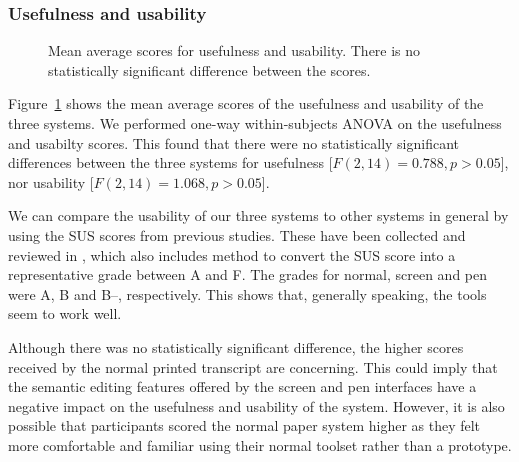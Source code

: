 \subsubsection{Usefulness and usability}

\begin{figure}[p]
  \centering
  \label{fig:usefulusable}
  \caption{Mean average scores for usefulness and usability. There is no statistically significant difference between
  the scores.}
\end{figure}

Figure~\ref{fig:usefulusable} shows the mean average scores of the usefulness and usability of the three systems.  We
performed one-way within-subjects ANOVA on the usefulness and usabilty scores. This found that there were no
statistically significant differences between the three systems for usefulness [$F(2,14)=0.788, p>0.05$], nor usability
[$F(2,14)=1.068, p>0.05$].

We can compare the usability of our three systems to other systems in general by using the SUS scores from 
previous studies. These have been collected and reviewed in \citet{Sauro2016}, which also includes method to convert
the SUS score into a representative grade between A and F.  The grades for normal, screen and pen were A, B and B--,
respectively. This shows that, generally speaking, the tools seem to work well.

Although there was no statistically significant difference, the higher scores received by the normal printed transcript
are concerning. This could imply that the semantic editing features offered by the screen and pen interfaces have a
negative impact on the usefulness and usability of the system. However, it is also possible that participants scored
the normal paper system higher as they felt more comfortable and familiar using their normal toolset rather than a
prototype.

